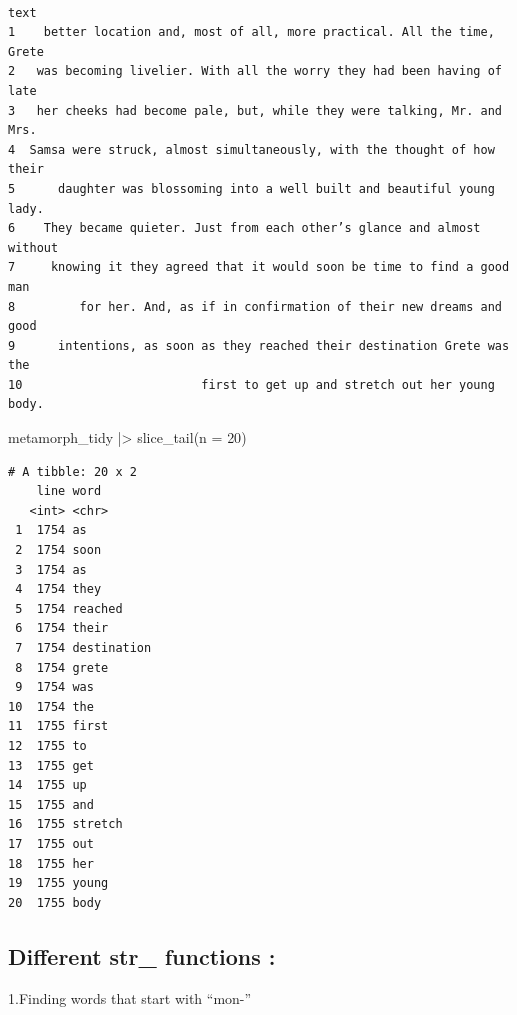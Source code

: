 \documentclass[
  letterpaper,
  DIV=11,
  numbers=noendperiod]{scrartcl}
\newenvironment{Shaded}{\begin{snugshade}}{\end{snugshade}}
\newcommand{\AttributeTok}[1]{\textcolor[rgb]{0.40,0.45,0.13}{#1}}
\newcommand{\DecValTok}[1]{\textcolor[rgb]{0.68,0.00,0.00}{#1}}
\newcommand{\FunctionTok}[1]{\textcolor[rgb]{0.28,0.35,0.67}{#1}}
\newcommand{\NormalTok}[1]{\textcolor[rgb]{0.00,0.23,0.31}{#1}}
\newcommand{\SpecialCharTok}[1]{\textcolor[rgb]{0.37,0.37,0.37}{#1}}
\newcommand{\StringTok}[1]{\textcolor[rgb]{0.13,0.47,0.30}{#1}}
\begin{document}
\begin{verbatim}
                                                                      text
1    better location and, most of all, more practical. All the time, Grete
2   was becoming livelier. With all the worry they had been having of late
3   her cheeks had become pale, but, while they were talking, Mr. and Mrs.
4  Samsa were struck, almost simultaneously, with the thought of how their
5      daughter was blossoming into a well built and beautiful young lady.
6    They became quieter. Just from each other’s glance and almost without
7     knowing it they agreed that it would soon be time to find a good man
8         for her. And, as if in confirmation of their new dreams and good
9      intentions, as soon as they reached their destination Grete was the
10                         first to get up and stretch out her young body.
\end{verbatim}

\begin{Shaded}
\begin{Highlighting}[]
\NormalTok{metamorph\_tidy }\SpecialCharTok{|\textgreater{}} \FunctionTok{slice\_tail}\NormalTok{(}\AttributeTok{n =} \DecValTok{20}\NormalTok{)}
\end{Highlighting}
\end{Shaded}

\begin{verbatim}
# A tibble: 20 x 2
    line word       
   <int> <chr>      
 1  1754 as         
 2  1754 soon       
 3  1754 as         
 4  1754 they       
 5  1754 reached    
 6  1754 their      
 7  1754 destination
 8  1754 grete      
 9  1754 was        
10  1754 the        
11  1755 first      
12  1755 to         
13  1755 get        
14  1755 up         
15  1755 and        
16  1755 stretch    
17  1755 out        
18  1755 her        
19  1755 young      
20  1755 body       
\end{verbatim}

\subsection{Different str\_ functions :}\label{different-str_-functions}

1.Finding words that start with ``mon-''

\begin{Shaded}
\end{Shaded}
\end{document}
